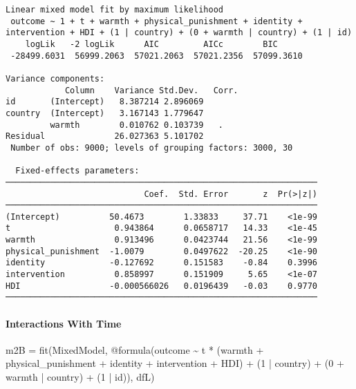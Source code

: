 \documentclass[
  letterpaper,
  DIV=11,
  numbers=noendperiod]{scrreprt}
\let\oldparagraph\paragraph
\renewcommand{\paragraph}[1]{\oldparagraph{#1}\mbox{}}
\newenvironment{Shaded}{\begin{snugshade}}{\end{snugshade}}
\newcommand{\FloatTok}[1]{\textcolor[rgb]{0.68,0.00,0.00}{#1}}
\newcommand{\FunctionTok}[1]{\textcolor[rgb]{0.28,0.35,0.67}{#1}}
\newcommand{\NormalTok}[1]{\textcolor[rgb]{0.00,0.23,0.31}{#1}}
\newcommand{\OperatorTok}[1]{\textcolor[rgb]{0.37,0.37,0.37}{#1}}
\newcommand{\PreprocessorTok}[1]{\textcolor[rgb]{0.68,0.00,0.00}{#1}}
\begin{document}
\begin{verbatim}
Linear mixed model fit by maximum likelihood
 outcome ~ 1 + t + warmth + physical_punishment + identity + intervention + HDI + (1 | country) + (0 + warmth | country) + (1 | id)
    logLik   -2 logLik      AIC         AICc        BIC     
 -28499.6031  56999.2063  57021.2063  57021.2356  57099.3610

Variance components:
            Column    Variance Std.Dev.   Corr.
id       (Intercept)   8.387214 2.896069
country  (Intercept)   3.167143 1.779647
         warmth        0.010762 0.103739   .  
Residual              26.027363 5.101702
 Number of obs: 9000; levels of grouping factors: 3000, 30

  Fixed-effects parameters:
───────────────────────────────────────────────────────────────
                            Coef.  Std. Error       z  Pr(>|z|)
───────────────────────────────────────────────────────────────
(Intercept)          50.4673        1.33833     37.71    <1e-99
t                     0.943864      0.0658717   14.33    <1e-45
warmth                0.913496      0.0423744   21.56    <1e-99
physical_punishment  -1.0079        0.0497622  -20.25    <1e-90
identity             -0.127692      0.151583    -0.84    0.3996
intervention          0.858997      0.151909     5.65    <1e-07
HDI                  -0.000566026   0.0196439   -0.03    0.9770
───────────────────────────────────────────────────────────────
\end{verbatim}

\paragraph{Interactions With Time}\label{interactions-with-time-2}

\begin{Shaded}
\begin{Highlighting}[]
\NormalTok{m2B }\OperatorTok{=} \FunctionTok{fit}\NormalTok{(MixedModel, }\PreprocessorTok{@formula}\NormalTok{(outcome }\OperatorTok{\textasciitilde{}}\NormalTok{ t }\OperatorTok{*}\NormalTok{ (warmth }\OperatorTok{+} 
\NormalTok{                                 physical\_punishment }\OperatorTok{+} 
\NormalTok{                                 identity }\OperatorTok{+}\NormalTok{ intervention }\OperatorTok{+} 
\NormalTok{                                   HDI) }\OperatorTok{+}
\NormalTok{                                 (}\FloatTok{1} \OperatorTok{|}\NormalTok{ country) }\OperatorTok{+}
\NormalTok{                                 (}\FloatTok{0} \OperatorTok{+}\NormalTok{ warmth }\OperatorTok{|}\NormalTok{ country) }\OperatorTok{+}
\NormalTok{                                 (}\FloatTok{1} \OperatorTok{|}\NormalTok{ id)), dfL)}
\end{Highlighting}
\end{Shaded}
\end{document}
